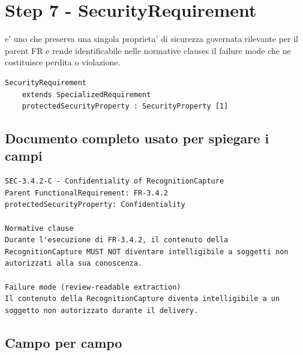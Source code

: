 \documentclass[11pt,a4paper]{article}
\begin{document}
\section{Step 7 - SecurityRequirement}
\closedtag

\SECR{} e' uno \SR{} che preserva una singola proprieta' di sicurezza governata rilevante per il parent FR e rende identificabile nelle normative clauses il failure mode che ne costituisce perdita o violazione.

\begin{lstlisting}
SecurityRequirement
    extends SpecializedRequirement
    protectedSecurityProperty : SecurityProperty [1]
\end{lstlisting}

\subsection{Documento completo usato per spiegare i campi}

\begin{ddtaexample}[title={Facial Access - SEC-3.4.2-C Confidentiality}]
\begin{lstlisting}
SEC-3.4.2-C - Confidentiality of RecognitionCapture
Parent FunctionalRequirement: FR-3.4.2
protectedSecurityProperty: Confidentiality

Normative clause
Durante l'esecuzione di FR-3.4.2, il contenuto della
RecognitionCapture MUST NOT diventare intelligibile a soggetti non
autorizzati alla sua conoscenza.

Failure mode (review-readable extraction)
Il contenuto della RecognitionCapture diventa intelligibile a un
soggetto non autorizzato durante il delivery.
\end{lstlisting}
\end{ddtaexample}

\subsection{Campo per campo}
\end{document}
